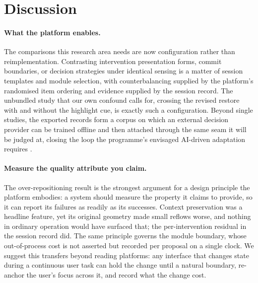 \section{Discussion}
\label{sec:discussion}

\paragraph{What the platform enables.}
The comparisons this research area needs are now configuration rather than reimplementation.
Contrasting intervention presentation forms, commit boundaries, or decision strategies under identical sensing is a matter of session templates and module selection, with counterbalancing supplied by the platform's randomised item ordering and evidence supplied by the session record.
The unbundled study that our own confound calls for, crossing the revised restore with and without the highlight cue, is exactly such a configuration.
Beyond single studies, the exported records form a corpus on which an external decision provider can be trained offline and then attached through the same seam it will be judged at, closing the loop the programme's envisaged AI-driven adaptation requires \cite{dtucompute2025rtr}.

\paragraph{Measure the quality attribute you claim.}
The over-repositioning result is the strongest argument for a design principle the platform embodies: a system should measure the property it claims to provide, so it can report its failures as readily as its successes.
Context preservation was a headline feature, yet its original geometry made small reflows worse, and nothing in ordinary operation would have surfaced that; the per-intervention residual in the session record did.
The same principle governs the module boundary, whose out-of-process cost is not asserted but recorded per proposal on a single clock.
We suggest this transfers beyond reading platforms: any interface that changes state during a continuous user task can hold the change until a natural boundary, re-anchor the user's focus across it, and record what the change cost.

